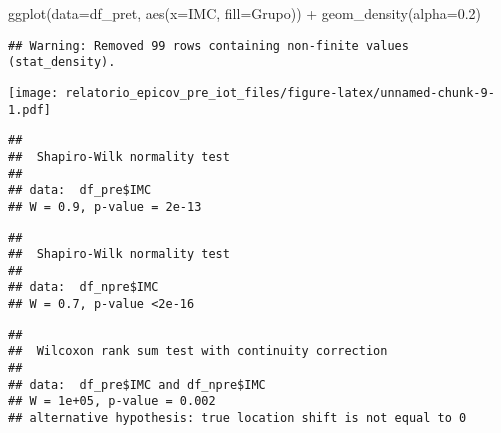 \documentclass[
]{article}
\newenvironment{Shaded}{\begin{snugshade}}{\end{snugshade}}
\newcommand{\AttributeTok}[1]{\textcolor[rgb]{0.77,0.63,0.00}{#1}}
\newcommand{\FloatTok}[1]{\textcolor[rgb]{0.00,0.00,0.81}{#1}}
\newcommand{\FunctionTok}[1]{\textcolor[rgb]{0.00,0.00,0.00}{#1}}
\newcommand{\NormalTok}[1]{#1}
\newcommand{\SpecialCharTok}[1]{\textcolor[rgb]{0.00,0.00,0.00}{#1}}
\begin{document}
\begin{Shaded}
\begin{Highlighting}[]
\FunctionTok{ggplot}\NormalTok{(}\AttributeTok{data=}\NormalTok{df\_pret, }\FunctionTok{aes}\NormalTok{(}\AttributeTok{x=}\NormalTok{IMC, }\AttributeTok{fill=}\NormalTok{Grupo)) }\SpecialCharTok{+}
  \FunctionTok{geom\_density}\NormalTok{(}\AttributeTok{alpha=}\FloatTok{0.2}\NormalTok{)}
\end{Highlighting}
\end{Shaded}

\begin{verbatim}
## Warning: Removed 99 rows containing non-finite values (stat_density).
\end{verbatim}

\texttt{[image: relatorio\_epicov\_pre\_iot\_files/figure-latex/unnamed-chunk-9-1.pdf]}

\begin{Shaded}
\end{Shaded}

\begin{verbatim}
## 
##  Shapiro-Wilk normality test
## 
## data:  df_pre$IMC
## W = 0.9, p-value = 2e-13
\end{verbatim}

\begin{Shaded}
\end{Shaded}

\begin{verbatim}
## 
##  Shapiro-Wilk normality test
## 
## data:  df_npre$IMC
## W = 0.7, p-value <2e-16
\end{verbatim}

\begin{Shaded}
\end{Shaded}

\begin{verbatim}
## 
##  Wilcoxon rank sum test with continuity correction
## 
## data:  df_pre$IMC and df_npre$IMC
## W = 1e+05, p-value = 0.002
## alternative hypothesis: true location shift is not equal to 0
\end{verbatim}
\end{document}
